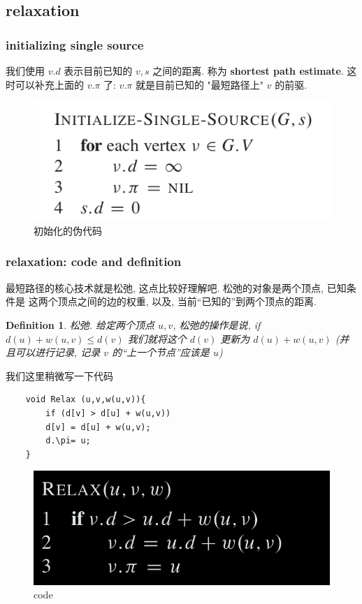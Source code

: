 \documentclass[a4paper, 10pt]{ctexart} %
\newtheorem{definition}{Definition}
\begin{document}
\subsection{relaxation}
\subsubsection{initializing single source}
我们使用 $v.d$ 表示目前已知的 $v, s$ 之间的距离. 称为 \textbf{shortest path estimate}. 这时可以补充上面的 $v.\pi$ 了: $v.\pi$ 就是目前已知的 "最短路径上" $v$ 的前驱.
\begin{figure}[H]
    \centering
    \includegraphics[scale = 0.5]{sssp2.png}
    \caption{初始化的伪代码}
    \label{iss}
\end{figure}
\subsubsection{relaxation: code and definition}
最短路径的核心技术就是松弛, 这点比较好理解吧. 松弛的对象是两个顶点, 已知条件是
这两个顶点之间的边的权重, 以及, 当前``已知的''到两个顶点的距离.
\begin{definition}
松弛. 给定两个顶点 $u ,v$, 松弛的操作是说, if $d \left( u\right) + w \left( u , v\right) \le d \left( v\right)$
我们就将这个 $d \left(v\right)$ 更新为 
$d \left(u \right) + w \left( u, v\right)$ (并且可以进行记录, 记录 $v$ 的``上一个节点''应该是 $u$)
\end{definition}
我们这里稍微写一下代码
\begin{verbatim}
    void Relax (u,v,w(u,v)){
        if (d[v] > d[u] + w(u,v))
        d[v] = d[u] + w(u,v);
        d.\pi= u;
    }
\end{verbatim}

\begin{figure}[H]
    \centering
    \includegraphics[scale = 0.5]{sssp3.png}
    \caption{code}
    \label{relaxation}
\end{figure}
\end{document}
